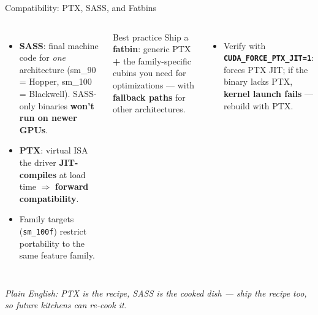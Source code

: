 \documentclass[aspectratio=169]{beamer}
\newcommand{\kw}[1]{\textbf{\textcolor{kwblue}{#1}}}
\newcommand{\pe}[1]{{\footnotesize\itshape Plain English: #1}}
\begin{document}
\begin{frame}{Compatibility: PTX, SASS, and Fatbins}
  \begin{columns}[t]
    \begin{itemize}
      \item \kw{SASS}: final machine code for \emph{one} architecture (sm\_90 = Hopper,
            sm\_100 = Blackwell). SASS-only binaries \kw{won't run on newer GPUs}.
      \item \kw{PTX}: virtual ISA the driver \kw{JIT-compiles} at load time $\Rightarrow$
            \kw{forward compatibility}.
      \item Family targets (\texttt{sm\_100f}) restrict portability to the same feature family.
    \end{itemize}
    \begin{block}{Best practice}
      \small Ship a \kw{fatbin}: generic PTX \kw{+} the family-specific cubins you need for
      optimizations --- with \kw{fallback paths} for other architectures.
    \end{block}
    \begin{itemize}\small
      \item Verify with \kw{\texttt{CUDA\_FORCE\_PTX\_JIT=1}}: forces PTX JIT;
            if the binary lacks PTX, \kw{kernel launch fails} --- rebuild with PTX.
    \end{itemize}
  \end{columns}
  \medskip
  \pe{PTX is the recipe, SASS is the cooked dish --- ship the recipe too, so future kitchens can re-cook it.}
\end{frame}
\end{document}
